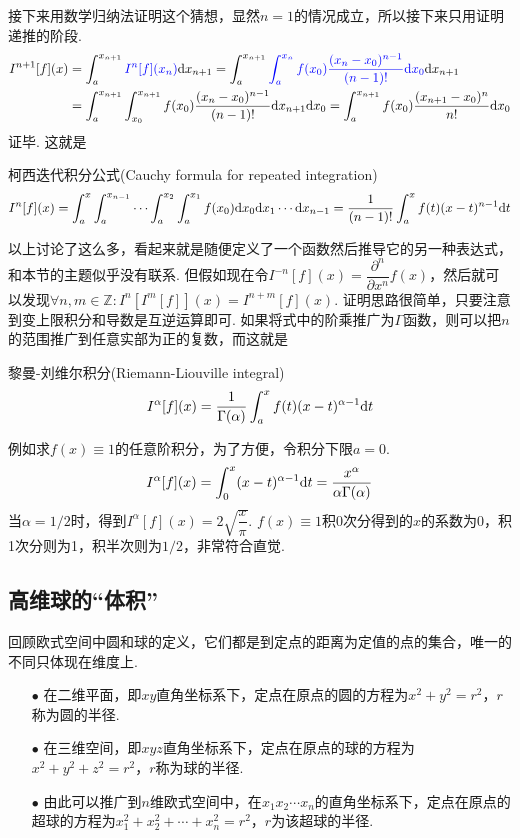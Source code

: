 \documentclass[main.tex]{subfiles}
\begin{document}
接下来用数学归纳法证明这个猜想，显然\(n=1\)的情况成立，所以接下来只用证明递推的阶段.
\begin{align*}
    I^{n+1}[f](x) &= \int_{a}^{x_{n+1}}{\color{blue}I^n[f](x_n)}{\rm d}x_{n+1} = \int_{a}^{x_{n+1}}{\color{blue}\int_{a}^{x_n}f(x_0)\frac{(x_n-x_0)^{n-1}}{(n-1)!}{\rm d}x_{0}}{\rm d}x_{n+1} \\
    &= \int_{a}^{x_{n+1}}\int_{x_0}^{x_{n+1}}f(x_0)\frac{(x_n-x_0)^{n-1}}{(n-1)!}{\rm d}x_{n+1}{\rm d}x_0 = \int_{a}^{x_{n+1}}f(x_0)\frac{(x_{n+1}-x_0)^n}{n!}{\rm d}x_0
\end{align*}
证毕. 这就是
\begin{theorem}{柯西迭代积分公式(Cauchy formula for repeated integration)}
    \[I^n[f](x) = \int_{a}^{x} \int_{a}^{x_{n-1}} \cdots \int_{a}^{x_2}\int_{a}^{x_1}f(x_0){\rm d}x_0 {\rm d}x_1 \cdots {\rm d}x_{n-1} = \frac{1}{(n-1)!}\int_{a}^{x}f(t)(x-t)^{n-1}{\rm d}t\]
\end{theorem}

以上讨论了这么多，看起来就是随便定义了一个函数然后推导它的另一种表达式，和本节的主题似乎没有联系. 但假如现在令\(I^{-n}[f](x) = \dfrac{\partial^n}{\partial x^n}f(x)\)，然后就可以发现\(\forall n,m \in \mathbb{Z}: I^{n}[I^{m}[f]](x) = I^{n+m}[f](x)\). 证明思路很简单，只要注意到变上限积分和导数是互逆运算即可. 如果将式中的阶乘推广为\(\Gamma\)函数，则可以把\(n\)的范围推广到任意实部为正的复数，而这就是
\begin{definition}{黎曼-刘维尔积分(Riemann-Liouville integral)}
    \[I^{\alpha}[f](x) = \frac{1}{\Gamma(\alpha)}\int_{a}^{x}f(t)(x-t)^{\alpha-1}{\rm d}t\]
\end{definition}

例如求\(f(x)\equiv 1\)的任意阶积分，为了方便，令积分下限\(a=0\).
\[I^{\alpha}[f](x) = \int_{0}^{x}(x-t)^{\alpha-1}{\rm d}t = \frac{x^{\alpha}}{\alpha\Gamma(\alpha)}\]
当\(\alpha=1/2\)时，得到\(I^{\alpha}[f](x) = 2\sqrt{\dfrac{x}{\pi}}\). \(f(x) \equiv 1\)积0次分得到的\(x\)的系数为\(0\)，积1次分则为1，积半次则为\(1/2\)，非常符合直觉.

\subsection{高维球的“体积”}

回顾欧式空间中圆和球的定义，它们都是到定点的距离为定值的点的集合，唯一的不同只体现在维度上.
\begin{itemize}
    \item[\(\bullet\)] 在二维平面，即\(xy\)直角坐标系下，定点在原点的圆的方程为\(x^2+y^2=r^2\)，\(r\)称为圆的半径.
    \item[\(\bullet\)] 在三维空间，即\(xyz\)直角坐标系下，定点在原点的球的方程为\(x^2+y^2+z^2=r^2\)，\(r\)称为球的半径.
    \item[\(\bullet\)] 由此可以推广到\(n\)维欧式空间中，在\(x_1x_2\cdots x_n\)的直角坐标系下，定点在原点的超球的方程为\(x_1^2+x_2^2+\cdots+x_n^2=r^2\)，\(r\)为该超球的半径.
\end{itemize}
\end{document}

